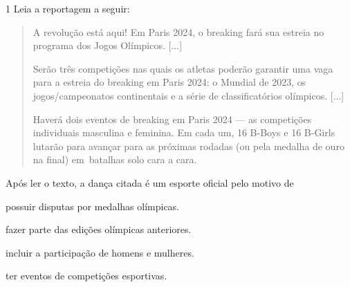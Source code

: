 
\num{1} Leia a reportagem a seguir:

\begin{quote}
A revolução está aqui! Em Paris 2024, o breaking fará sua
estreia no programa dos Jogos Olímpicos. {[}...{]}

Serão três competições nas quais os atletas poderão garantir uma vaga
para a estreia do breaking em Paris 2024: o Mundial de 2023, os
jogos/campeonatos continentais e a série de classificatórios olímpicos.
{[}...{]}

Haverá dois eventos de breaking em Paris 2024 --- as competições
individuais masculina e feminina. Em cada um, 16 B-Boys e 16 B-Girls
lutarão para avançar para as próximas rodadas (ou pela medalha de ouro
na final) em~batalhas solo cara a cara.

\end{quote}

Após ler o texto, a dança citada é um esporte oficial pelo motivo de

\begin{escolha}
\item possuir disputas por medalhas olímpicas.

\item fazer parte das edições olímpicas anteriores.

\item incluir a participação de homens e mulheres.

\item ter eventos de competições esportivas.
\end{escolha}


